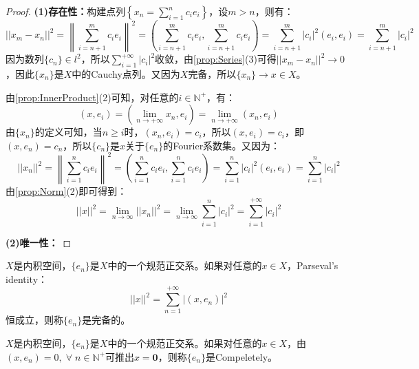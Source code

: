\begin{proof}
	\textbf{(1)存在性：}构建点列$\left\{x_n=\sum\limits_{i=1}^{n}c_ie_i\right\}$，设$m>n$，则有：
	\begin{equation*}
		||x_m-x_n||^2=\left\|\sum_{i=n+1}^{m}c_ie_i\right\|^2=\left(\sum_{i=n+1}^{m}c_ie_i,\sum_{i=n+1}^{m}c_ie_i\right)=\sum_{i=n+1}^{m}|c_i|^2(e_i,e_i)=\sum_{i=n+1}^{m}|c_i|^2
	\end{equation*}
	因为数列$\{c_n\}\in l^2$，所以$\sum\limits_{i=1}^{+\infty}|c_i|^2$收敛，由\cref{prop:Series}(3)可得$||x_m-x_n||^2\to0$，因此$\{x_n\}$是$X$中的Cauchy点列。又因为$X$完备，所以$\{x_n\}\to x\in X$。\par
	由\cref{prop:InnerProduct}(2)可知，对任意的$i\in\mathbb{N}^+$，有：
	\begin{equation*}
		(x,e_{i})=\left(\lim_{n\to+\infty}x_n,e_{i}\right)=\lim_{n\to+\infty}(x_n,e_{i})
	\end{equation*}
	由$\{x_n\}$的定义可知，当$n\geqslant i$时，$(x_n,e_{i})=c_{i}$，所以$(x,e_{i})=c_{i}$，即$(x,e_n)=c_n$，所以$\{c_n\}$是$x$关于$\{e_n\}$的Fourier系数集。又因为：
	\begin{equation*}
		||x_n||^2=\left\|\sum_{i=1}^{n}c_ie_i\right\|^2=\left(\sum_{i=1}^{n}c_ie_i,\sum_{i=1}^{n}c_ie_i\right)=\sum_{i=1}^{n}|c_i|^2(e_i,e_i)=\sum_{i=1}^{n}|c_i|^2
	\end{equation*}
	由\cref{prop:Norm}(2)即可得到：
	\begin{equation*}
		||x||^2=\lim_{n\to\infty}||x_n||^2=\lim_{n\to\infty}\sum_{i=1}^{n}|c_i|^2=\sum_{i=1}^{+\infty}|c_i|^2
	\end{equation*}\par
	\textbf{(2)唯一性：}
\end{proof}
\begin{definition}
	$X$是内积空间，$\{e_n\}$是$X$中的一个规范正交系。如果对任意的$x\in X$，Parseval's identity：
	\begin{equation*}
		||x||^2=\sum_{n=1}^{+\infty}|(x,e_n)|^2
	\end{equation*}
	恒成立，则称$\{e_n\}$是完备的。
\end{definition}
\begin{definition}
	$X$是内积空间，$\{e_n\}$是$X$中的一个规范正交系。如果对任意的$x\in X$，由$(x,e_n)=0,\;\forall\;n\in\mathbb{N}^+$可推出$x=\mathbf{0}$，则称$\{e_n\}$是\gls{Compeletely}。
\end{definition}
